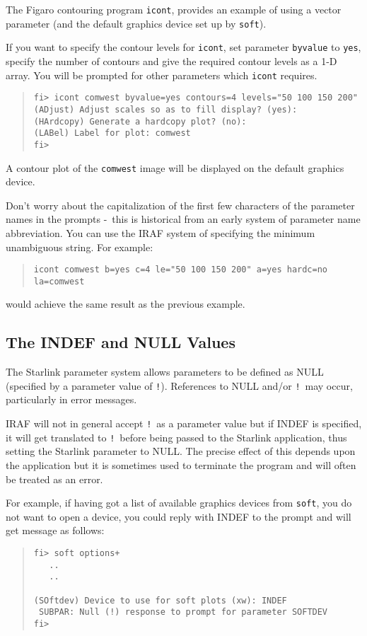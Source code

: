\documentclass[twoside,11pt]{article}
\newcommand{\xlabel}[1]{}
\newcommand{\dash}{--}
\renewcommand{\dash}{-}
\begin{document}
The Figaro contouring program \texttt{icont}, provides
an example of using a vector parameter (and the default graphics device set up
by \texttt{soft}).

If you want to specify the contour levels for \texttt{icont}, set
parameter \texttt{byvalue} to \texttt{yes}, specify the number of contours
and give the required contour levels as a 1-D array. You will be prompted for
other parameters which \texttt{icont} requires.
\begin{quote} \begin{verbatim}
fi> icont comwest byvalue=yes contours=4 levels="50 100 150 200"
(ADjust) Adjust scales so as to fill display? (yes):
(HArdcopy) Generate a hardcopy plot? (no):
(LABel) Label for plot: comwest
fi>
\end{verbatim} \end{quote}
A contour plot of the \texttt{comwest} image will be displayed on the default
graphics device.

Don't worry about the capitalization of the first few characters of the
parameter names in the prompts \dash\ this is historical from an early system
of parameter name abbreviation. You can use the IRAF system of specifying the
minimum unambiguous string. For example:
\begin{quote} \begin{verbatim}
icont comwest b=yes c=4 le="50 100 150 200" a=yes hardc=no la=comwest
\end{verbatim} \end{quote}
would achieve the same result as the previous example.

\subsection{\xlabel{the_indef_and_null_values}\label{indef_and_null}The INDEF and NULL Values}
The Starlink parameter system allows parameters to be defined as NULL
(specified by a parameter value of \texttt{!}).
References to NULL and/or \texttt{!}\ may occur, particularly in error messages.

IRAF will not in general accept \texttt{!}\ as a parameter value but if INDEF
is specified, it will get translated to \texttt{!}\ before being passed to the
Starlink application, thus setting the Starlink parameter to NULL.
The precise effect of this depends upon the application but it is sometimes
used to terminate the program and will often be treated as an error.

For example, if having got a list of available graphics devices from
\texttt{soft}, you do not want to open a device, you could reply with INDEF to
the prompt and will get message as follows:
\begin{quote} \begin{verbatim}
fi> soft options+
   ..
   ..

(SOftdev) Device to use for soft plots (xw): INDEF
 SUBPAR: Null (!) response to prompt for parameter SOFTDEV
fi>
\end{verbatim} \end{quote}
\end{document}
